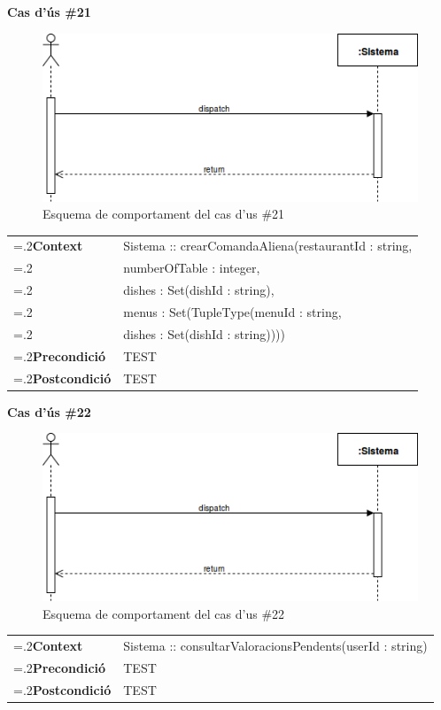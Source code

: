 \clearpage
\noindent\textbf{\large Cas d'ús \#21}\\
\begin{figure}[H]
\centering
\includegraphics[scale=0.6]{Figures/casdus_00.png}
\caption{Esquema de comportament del cas d'us \#21}
\end{figure}
\begin{table}[h]
\noindent
\begin{tabularx}{\linewidth}{
>{\hsize=.2\hsize}X%
>{\hsize=0.8\hsize}X%
}
\textbf{Context} 		& Sistema :: crearComandaAliena(restaurantId : string, \\
						& numberOfTable : integer, \\
						& dishes : Set(dishId : string), \\
						& menus : Set(TupleType(menuId : string, \\
						& dishes : Set(dishId : string)))) \\
\textbf{Precondició} 	& TEST \\
\textbf{Postcondició}	& TEST \\
\end{tabularx}
\label{}
\end{table}

\noindent\textbf{\large Cas d'ús \#22}\\
\begin{figure}[H]
\centering
\includegraphics[scale=0.6]{Figures/casdus_00.png}
\caption{Esquema de comportament del cas d'us \#22}
\end{figure}
\begin{table}[h]
\noindent
\begin{tabularx}{\linewidth}{
>{\hsize=.2\hsize}X%
>{\hsize=0.8\hsize}X%
}
\textbf{Context} 		& Sistema :: consultarValoracionsPendents(userId : string) \\
\textbf{Precondició} 	& TEST \\
\textbf{Postcondició}	& TEST \\
\end{tabularx}
\label{}
\end{table}

